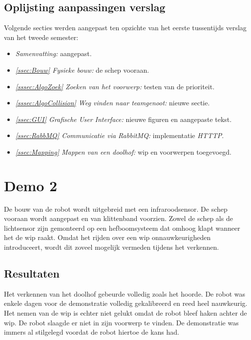 \documentclass[eind]{penoverslag}
\begin{document}
\subsection{Oplijsting aanpassingen verslag}
\label{Assec:aanp1}
Volgende secties werden aangepast ten opzichte van het eerste tussentijds verslag van het tweede semester:

\begin{itemize}
\item \textit{Samenvatting:} aangepast.
\item \textit{\ref{ssec:Bouw} Fysieke bouw:} de schep vooraan.
\item \textit{\ref{sssec:AlgoZoek} Zoeken van het voorwerp:} testen van de prioriteit.
\item \textit{\ref{sssec:AlgoCollision} Weg vinden naar teamgenoot:} nieuwe sectie.
\item \textit{\ref{ssec:GUI} Grafische User Interface:} nieuwe figuren en aangepaste tekst.
\item \textit{\ref{ssec:RabbMQ} Communicatie via RabbitMQ:} implementatie \textit{HTTTP}.
\item \textit{\ref{ssec:Mapping} Mappen van een doolhof:} wip en voorwerpen toegevoegd.
\end{itemize}

\section{Demo 2}
\label{Asec:demo2}
De bouw van de robot wordt uitgebreid met een infraroodsensor. De schep vooraan wordt aangepast en van klittenband voorzien. Zowel de schep als de lichtsensor zijn gemonteerd op een hefboomsysteem dat omhoog klapt wanneer het de wip raakt. Omdat het rijden over een wip onnauwkeurigheden introduceert, wordt dit zoveel mogelijk vermeden tijdens het verkennen.

\subsection{Resultaten}
\label{Assec:result2}
Het verkennen van het doolhof gebeurde volledig zoals het hoorde. De robot was enkele dagen voor de demonstratie volledig gekalibreerd en reed heel nauwkeurig. Het nemen van de wip is echter niet gelukt omdat de robot bleef haken achter de wip.
De robot slaagde er niet in zijn voorwerp te vinden. De demonstratie was immers al stilgelegd voordat de robot hiertoe de kans had.
\end{document}
